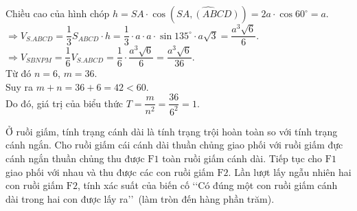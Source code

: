 \begin{ex}
{Chiều cao của hình chóp $h = SA \cdot \cos (\widehat{SA, (ABCD)}) = 2a \cdot \cos 60^\circ = a$.\\
$\Rightarrow V_{S.ABCD} = \dfrac{1}{3} S_{ABCD} \cdot h = \dfrac{1}{3} \cdot a \cdot a \cdot \sin 135^\circ \cdot a\sqrt{3} = \dfrac{a^3\sqrt{6}}{6}$.\\
$\Rightarrow V_{SBNPM} = \dfrac{1}{6} V_{S.ABCD} = \dfrac{1}{6} \cdot \dfrac{a^3\sqrt{6}}{6} = \dfrac{a^3\sqrt{6}}{36}$.\\
Từ đó $n=6$, $m=36$.\\
Suy ra $m+n = 36+6 = 42 < 60$.\\
Do đó, giá trị của biểu thức $T = \dfrac{m}{n^2} = \dfrac{36}{6^2} = 1$.
}
\end{ex}

\begin{ex}%
	Ở ruồi giấm, tính trạng cánh dài là tính trạng trội hoàn toàn so với tính trạng cánh ngắn. Cho ruồi giấm cái cánh dài thuần chủng giao phối với ruồi giấm đực cánh ngắn thuần chủng thu được $\mathrm{F}1$ toàn ruồi giấm cánh dài. Tiếp tục cho $\mathrm{F}1$ giao phối với nhau và thu được các con ruồi giấm $\mathrm{F}2$. Lần lượt lấy ngẫu nhiên hai con ruồi giấm $\mathrm{F}2$, tính xác suất của biến cố \lq\lq Có đúng một con ruồi giấm cánh dài trong hai con được lấy ra\rq\rq~(làm tròn đến hàng phần trăm).
	\end{ex}


